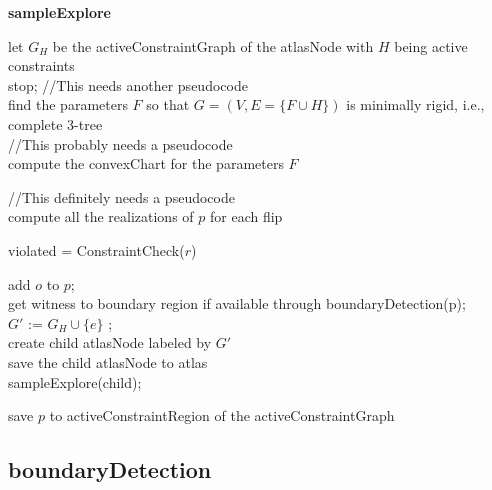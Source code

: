 \begin{algorithm} [htbp]

 {\bf sampleExplore}\\
 \BlankLine

	let $G_H$ be the activeConstraintGraph of the atlasNode with $H$ being active constraints\\
		{stop;	}
	//This needs another pseudocode\\
	find the parameters $F$ so that $G = (V, E = \{F\cup H\})$ is minimally rigid, i.e., complete 3-tree\\
	
	//This probably needs a pseudocode\\
	compute the convexChart for the parameters $F$\\

	{
		//This definitely needs a pseudocode\\
		compute all the realizations of $p$ for each flip\\

		{
			violated = ConstraintCheck($r$)\\
			{

				add $o$ to $p$;\\
				get witness to boundary region if available through boundaryDetection(p);\\
				{
					$G'$ := $G_H \cup \{e\}$ ;\\
					{
						create child atlasNode labeled by $G'$\\
						save the child atlasNode to atlas\\
						sampleExplore(child);\\
					}
				}
			}
		}

		save $p$ to activeConstraintRegion of the activeConstraintGraph\\
	}

	\caption{sampleExplore}
\label{alg:sampleExplore}
\end{algorithm}




\subsection{boundaryDetection}

